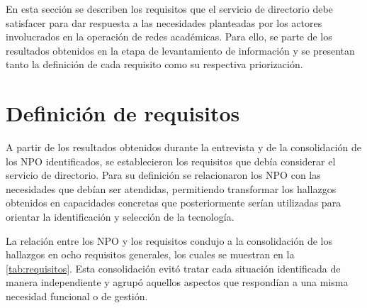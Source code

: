 \label{cap:identificacion-requisitos}
\vspace*{0.7cm}

En esta sección se describen los requisitos que el servicio de directorio debe satisfacer para dar respuesta a las necesidades planteadas por los actores involucrados en la operación de redes académicas. Para ello, se parte de los resultados obtenidos en la etapa de levantamiento de información y se presentan tanto la definición de cada requisito como su respectiva priorización.

\section{Definición de requisitos}\label{sec:definicion-requisitos}

A partir de los resultados obtenidos durante la entrevista y de la consolidación de los \ac{NPO} identificados, se establecieron los requisitos que debía considerar el servicio de directorio. Para su definición se relacionaron los \ac{NPO} con las necesidades que debían ser atendidas, permitiendo transformar los hallazgos obtenidos en capacidades concretas que posteriormente serían utilizadas para orientar la identificación y selección de la tecnología.

La relación entre los \ac{NPO} y los requisitos condujo a la consolidación de los hallazgos en ocho requisitos generales, los cuales se muestran en la \autoref{tab:requisitos}. Esta consolidación evitó tratar cada situación identificada de manera independiente y agrupó aquellos aspectos que respondían a una misma necesidad funcional o de gestión.


